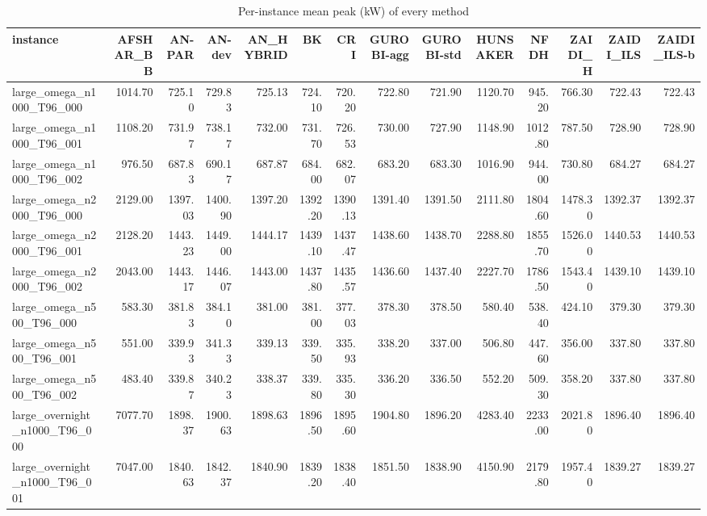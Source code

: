 \begin{table}[htbp]
\centering
\small
\caption{Per-instance mean peak (kW) of every method}
\label{tab:E10a_state_of_the_art_b10_per_instance}
\begin{tabular}{lrrrrrrrrrrrrr}
\toprule
instance & AFSHAR\_BB & AN-PAR & AN-dev & AN\_HYBRID & BK & CRI & GUROBI-agg & GUROBI-std & HUNSAKER & NFDH & ZAIDI\_H & ZAIDI\_ILS & ZAIDI\_ILS-b \\
\midrule
large\_omega\_n1000\_T96\_000 & 1014.70 & 725.10 & 729.83 & 725.13 & 724.10 & 720.20 & 722.80 & 721.90 & 1120.70 & 945.20 & 766.30 & 722.43 & 722.43 \\
large\_omega\_n1000\_T96\_001 & 1108.20 & 731.97 & 738.17 & 732.00 & 731.70 & 726.53 & 730.00 & 727.90 & 1148.90 & 1012.80 & 787.50 & 728.90 & 728.90 \\
large\_omega\_n1000\_T96\_002 & 976.50 & 687.83 & 690.17 & 687.87 & 684.00 & 682.07 & 683.20 & 683.30 & 1016.90 & 944.00 & 730.80 & 684.27 & 684.27 \\
large\_omega\_n2000\_T96\_000 & 2129.00 & 1397.03 & 1400.90 & 1397.20 & 1392.20 & 1390.13 & 1391.40 & 1391.50 & 2111.80 & 1804.60 & 1478.30 & 1392.37 & 1392.37 \\
large\_omega\_n2000\_T96\_001 & 2128.20 & 1443.23 & 1449.00 & 1444.17 & 1439.10 & 1437.47 & 1438.60 & 1438.70 & 2288.80 & 1855.70 & 1526.00 & 1440.53 & 1440.53 \\
large\_omega\_n2000\_T96\_002 & 2043.00 & 1443.17 & 1446.07 & 1443.00 & 1437.80 & 1435.57 & 1436.60 & 1437.40 & 2227.70 & 1786.50 & 1543.40 & 1439.10 & 1439.10 \\
large\_omega\_n500\_T96\_000 & 583.30 & 381.83 & 384.10 & 381.00 & 381.00 & 377.03 & 378.30 & 378.50 & 580.40 & 538.40 & 424.10 & 379.30 & 379.30 \\
large\_omega\_n500\_T96\_001 & 551.00 & 339.93 & 341.33 & 339.13 & 339.50 & 335.93 & 338.20 & 337.00 & 506.80 & 447.60 & 356.00 & 337.80 & 337.80 \\
large\_omega\_n500\_T96\_002 & 483.40 & 339.87 & 340.23 & 338.37 & 339.80 & 335.30 & 336.20 & 336.50 & 552.20 & 509.30 & 358.20 & 337.80 & 337.80 \\
large\_overnight\_n1000\_T96\_000 & 7077.70 & 1898.37 & 1900.63 & 1898.63 & 1896.50 & 1895.60 & 1904.80 & 1896.20 & 4283.40 & 2233.00 & 2021.80 & 1896.40 & 1896.40 \\
large\_overnight\_n1000\_T96\_001 & 7047.00 & 1840.63 & 1842.37 & 1840.90 & 1839.20 & 1838.40 & 1851.50 & 1838.90 & 4150.90 & 2179.80 & 1957.40 & 1839.27 & 1839.27 \\

\end{tabular}
\end{table}
